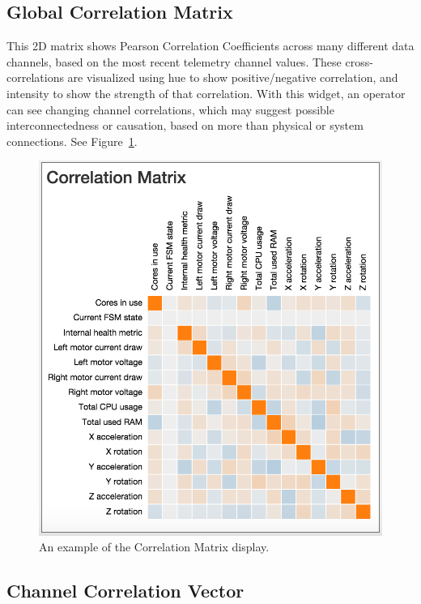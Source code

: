 \documentclass[letterpaper, 10 pt, conference]{ieeeconf}  %
\begin{document}
\subsection{Global Correlation Matrix}

This 2D matrix shows Pearson Correlation Coefficients across many different data channels, based on the most recent telemetry channel values. These cross-correlations are visualized using hue to show positive/negative correlation, and intensity to show the strength of that correlation. With this widget, an operator can see changing channel correlations, which may suggest possible interconnectedness or causation, based on more than physical or system connections. See Figure~\ref{fig:gcm}.

\begin{figure}[h]
\centering
    \includegraphics[width=\columnwidth]{gcm2.png}
    \caption{An example of the Correlation Matrix display.}
    \label{fig:gcm}
\end{figure}

\subsection{Channel Correlation Vector}
\end{document}
